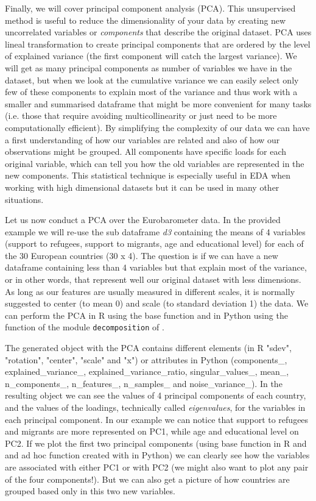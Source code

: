 Finally, we will cover principal component analysis (PCA). This unsupervised method is useful to reduce the dimensionality of your data by creating new uncorrelated variables or \textit{components} that describe the original dataset. PCA uses lineal transformation to create principal components that are ordered by the level of explained variance (the first component will catch the largest variance). We will get as many principal components as number of variables we have in the dataset, but when we look at the cumulative variance we can easily select only few of these components to explain most of the variance and thus work with a smaller and summarised dataframe that might be more convenient for many tasks (i.e. those that require avoiding multicollinearity or just need to be more computationally efficient). By simplifying the complexity of our data we can have a first understanding of how our variables are related and also of how our observations might be grouped. All components have specific loads for each original variable, which can tell you how the old variables are represented in the new components. This statistical technique is especially useful in EDA when working with high dimensional datasets but it can be used in many other situations.  

Let us now conduct a PCA over the Eurobarometer data.  In the provided example we will re-use the sub dataframe \emph{d3} containing the means of 4 variables (support to refugees, support to migrants, age and educational level) for each of the 30 European countries (30 x 4). The question is if we can have a new dataframe containing less than 4 variables but that explain most of the variance, or in other words, that represent well our original dataset with less dimensions. As long as our features are usually measured in different scales, it is normally suggested to center (to mean 0) and scale (to standard deviation 1) the data. We can perform the PCA in R using the base function  and in Python using the function  of the module \texttt{decomposition} of . 


The generated object with the PCA contains different elements (in R "sdev",     "rotation", "center",  "scale" and   "x") or attributes in Python (components\_, explained\_variance\_, explained\_variance\_ratio, singular\_values\_, mean\_, n\_components\_, n\_features\_, n\_samples\_ and noise\_variance\_). In the resulting object we can see the values of 4 principal components of each country, and the values of the loadings, technically called \textit{eigenvalues}, for the variables in each principal component. In our example we can notice that support to refugees and migrants are more represented on PC1, while age and educational level on PC2. If we plot the first two principal components (using base function  in R and and ad hoc function created with  in Python) we can clearly see how the variables are associated with either PC1 or with PC2 (we might also want to plot any pair of the four components!). But we can also get a picture of how countries are grouped based only in this two new variables.

